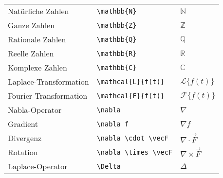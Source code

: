 \begin{longtable}{l l l}
    \midrule
    Natürliche Zahlen         & \texttt{\textbackslash mathbb\{N\}}                                                     & \( \mathbb{N} \)                     \\
    Ganze Zahlen              & \texttt{\textbackslash mathbb\{Z\}}                                                     & \( \mathbb{Z} \)                     \\
    Rationale Zahlen          & \texttt{\textbackslash mathbb\{Q\}}                                                     & \( \mathbb{Q} \)                     \\
    Reelle Zahlen             & \texttt{\textbackslash mathbb\{R\}}                                                     & \( \mathbb{R} \)                     \\
    Komplexe Zahlen           & \texttt{\textbackslash mathbb\{C\}}                                                     & \( \mathbb{C} \)                     \\

    \midrule
    Laplace-Transformation    & \texttt{\textbackslash mathcal\{L\}\{f(t)\}}                                            & \( \mathcal{L}\{f(t)\} \)            \\
    Fourier-Transformation    & \texttt{\textbackslash mathcal\{F\}\{f(t)\}}                                            & \( \mathcal{F}\{f(t)\} \)            \\
    Nabla-Operator            & \texttt{\textbackslash nabla}                                                           & \( \nabla \)                         \\
    Gradient                  & \texttt{\textbackslash nabla f}                                                         & \( \nabla f \)                       \\
    Divergenz                 & \texttt{\textbackslash nabla \textbackslash cdot \textbackslash vec{F}}                 & \( \nabla \cdot \vec{F} \)           \\
    Rotation                  & \texttt{\textbackslash nabla \textbackslash times \textbackslash vec{F}}                & \( \nabla \times \vec{F} \)          \\
    Laplace-Operator          & \texttt{\textbackslash Delta}                                                           & \( \Delta \)                         \\
\end{longtable}
